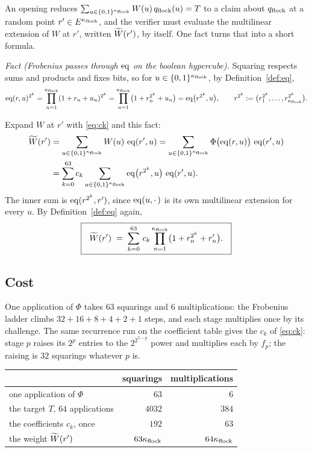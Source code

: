 An opening reduces $\sum_{u\in\{0,1\}^{\kappa_{\mathrm{flock}}}}W(u)\,q_{\mathrm{flock}}(u)=T$ to a claim about $q_{\mathrm{flock}}$ at a random point $r'\in E^{\kappa_{\mathrm{flock}}}$, and the verifier must evaluate the multilinear extension of $W$ at $r'$, written $\widetilde{W}(r')$, by itself. One fact turns that into a short formula.

\emph{Fact (Frobenius passes through $\operatorname{eq}$ on the boolean hypercube).} Squaring respects sums and products and fixes bits, so for $u\in\{0,1\}^{\kappa_{\mathrm{flock}}}$, by Definition~\ref{def:eq},
\[
\operatorname{eq}(r,u)^{2^k}=\prod_{n=1}^{\kappa_{\mathrm{flock}}}(1+r_n+u_n)^{2^k}=\prod_{n=1}^{\kappa_{\mathrm{flock}}}\bigl(1+r_n^{2^k}+u_n\bigr)=\operatorname{eq}\bigl(r^{2^k},u\bigr),
\qquad r^{2^k}:=\bigl(r_1^{2^k},\dots,r_{\kappa_{\mathrm{flock}}}^{2^k}\bigr).
\]

Expand $W$ at $r'$ with \eqref{eq:ck} and this fact:
\[
\begin{aligned}
\widetilde{W}(r')&=\sum_{u\in\{0,1\}^{\kappa_{\mathrm{flock}}}}W(u)\,\operatorname{eq}(r',u)
=\sum_{u\in\{0,1\}^{\kappa_{\mathrm{flock}}}}\Phi\bigl(\operatorname{eq}(r,u)\bigr)\,\operatorname{eq}(r',u)\\
&=\sum_{k=0}^{63}c_k\sum_{u\in\{0,1\}^{\kappa_{\mathrm{flock}}}}\operatorname{eq}\bigl(r^{2^k},u\bigr)\,\operatorname{eq}(r',u).
\end{aligned}
\]
The inner sum is $\operatorname{eq}(r^{2^k},r')$, since $\operatorname{eq}(u,\cdot\,)$ is its own multilinear extension for every $u$. By Definition~\ref{def:eq} again,
\[
\boxed{\ \
\widetilde{W}(r') \;=\; \sum_{k=0}^{63}\, c_k \prod_{n=1}^{\kappa_{\mathrm{flock}}}
\bigl( 1 + r_n^{2^k} + r'_n \bigr).
\ \ }
\]

\subsection{Cost}\label{rs:cost}

One application of $\Phi$ takes $63$ squarings and $6$ multiplications: the Frobenius ladder climbs $32+16+8+4+2+1$ steps, and each stage multiplies once by its challenge. The same recurrence run on the coefficient table gives the $c_k$ of \eqref{eq:ck}: stage $p$ raises its $2^p$ entries to the $2^{2^{5-p}}$ power and multiplies each by $f_p$; the raising is $32$ squarings whatever $p$ is.

\begin{center}
\begin{tabular}{lrr}
& squarings & multiplications\\[2pt]
\hline
one application of $\Phi$ & $63$ & $6$\\
the target $T$, $64$ applications & $4032$ & $384$\\
the coefficients $c_k$, once & $192$ & $63$\\
the weight $\widetilde{W}(r')$ & $63\kappa_{\mathrm{flock}}$ & $64\kappa_{\mathrm{flock}}$\\
\end{tabular}
\end{center}

